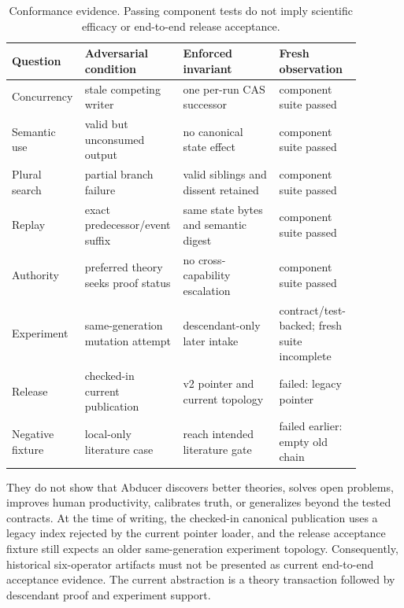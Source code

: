 \documentclass[11pt]{article}
\begin{document}
\begin{table}[ht]
\centering\scriptsize
\begin{tabular}{p{0.15\linewidth}p{0.23\linewidth}p{0.27\linewidth}p{0.23\linewidth}}
\toprule
Question & Adversarial condition & Enforced invariant & Fresh observation \\
\midrule
Concurrency & stale competing writer & one per-run CAS successor & component suite passed \\
Semantic use & valid but unconsumed output & no canonical state effect & component suite passed \\
Plural search & partial branch failure & valid siblings and dissent retained & component suite passed \\
Replay & exact predecessor/event suffix & same state bytes and semantic digest & component suite passed \\
Authority & preferred theory seeks proof status & no cross-capability escalation & component suite passed \\
Experiment & same-generation mutation attempt & descendant-only later intake & contract/test-backed; fresh suite incomplete \\
Release & checked-in current publication & v2 pointer and current topology & failed: legacy pointer \\
Negative fixture & local-only literature case & reach intended literature gate & failed earlier: empty old chain \\
\bottomrule
\end{tabular}
\caption{Conformance evidence. Passing component tests do not imply scientific efficacy or end-to-end release acceptance.}
\end{table}

They do not show that Abducer discovers better theories, solves open problems, improves human productivity, calibrates truth, or generalizes beyond the tested contracts. At the time of writing, the checked-in canonical publication uses a legacy index rejected by the current pointer loader, and the release acceptance fixture still expects an older same-generation experiment topology. Consequently, historical six-operator artifacts must not be presented as current end-to-end acceptance evidence. The current abstraction is a theory transaction followed by descendant proof and experiment support.
\end{document}
